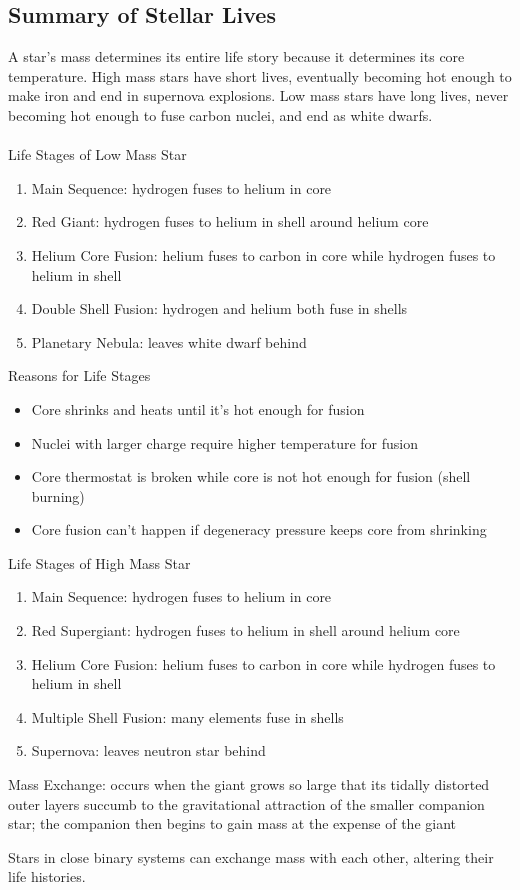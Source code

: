 \documentclass[12pt]{article}
\begin{document}
\subsection{Summary of Stellar Lives}
A star's mass determines its entire life story because it determines its core temperature. High mass stars have short lives, eventually becoming hot enough to make iron and end in supernova explosions. Low mass stars have long lives, never becoming hot enough to fuse carbon nuclei, and end as white dwarfs. \\~\\
Life Stages of Low Mass Star \begin{enumerate} 
\item Main Sequence: hydrogen fuses to helium in core
\item Red Giant: hydrogen fuses to helium in shell around helium core 
\item Helium Core Fusion: helium fuses to carbon in core while hydrogen fuses to helium in shell
\item Double Shell Fusion: hydrogen and helium both fuse in shells
\item Planetary Nebula: leaves white dwarf behind \end{enumerate} 
Reasons for Life Stages \begin{itemize} 
\item Core shrinks and heats until it's hot enough for fusion
\item Nuclei with larger charge require higher temperature for fusion
\item Core thermostat is broken while core is not hot enough for fusion (shell burning)
\item Core fusion can't happen if degeneracy pressure keeps core from shrinking \end{itemize} \newpage
Life Stages of High Mass Star \begin{enumerate} 
\item Main Sequence: hydrogen fuses to helium in core
\item Red Supergiant: hydrogen fuses to helium in shell around helium core 
\item Helium Core Fusion: helium fuses to carbon in core while hydrogen fuses to helium in shell
\item Multiple Shell Fusion: many elements fuse in shells
\item Supernova: leaves neutron star behind \end{enumerate} 
\begin{definition} Mass Exchange: occurs when the giant grows so large that its tidally distorted outer layers succumb to the gravitational attraction of the smaller companion star; the companion then begins to gain mass at the expense of the giant \end{definition}
Stars in close binary systems can exchange mass with each other, altering their life histories. 
\end{document}

